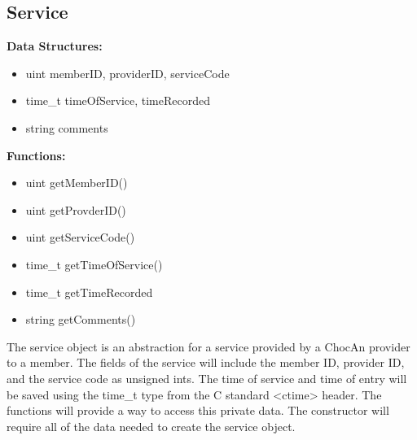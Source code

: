 \documentclass{article}
\begin{document}
\subsection{Service}
\textbf{Data Structures:}
\begin{itemize}
   \item uint memberID, providerID, serviceCode
   \item time_t timeOfService, timeRecorded
   \item string comments
\end{itemize}
\textbf{Functions:}
\begin{itemize}
   \item uint getMemberID()
   \item uint getProvderID()
   \item uint getServiceCode()
   \item time_t getTimeOfService()
   \item time_t getTimeRecorded
   \item string getComments()
\end{itemize}
The service object is an abstraction for a service provided by a ChocAn provider to a member. The fields of the service will include the member ID, provider ID, and the service code as unsigned ints. The time of service and time of entry will be saved using the time_t type from the C standard <ctime> header. The functions will provide a way to access this private data. The constructor will require all of the data needed to create the service object.
\end{document}
